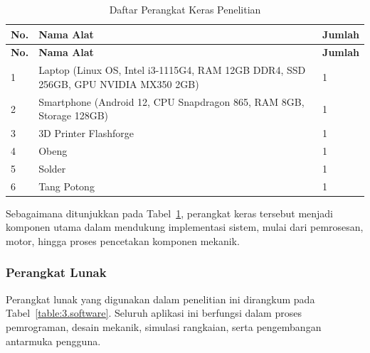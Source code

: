 \begin{longtable}{| b{}|p{}|p{}|} %
	\caption{Daftar Perangkat Keras Penelitian}
	\label{table:3.hardware} \\
	\hline
	\textbf{No.} & \textbf{Nama Alat} & \textbf{Jumlah} \\
	\hline
	\endfirsthead
	
	\hline
	\textbf{No.} & \textbf{Nama Alat} & \textbf{Jumlah} \\
	\hline
	\endhead
	
	1 & Laptop (Linux OS, Intel i3-1115G4, RAM 12GB DDR4, SSD 256GB, GPU NVIDIA MX350 2GB) & 1 \\
	\hline
	2 & Smartphone (Android 12, CPU Snapdragon 865, RAM 8GB, Storage 128GB) & 1 \\
	\hline
	3 & 3D Printer Flashforge & 1 \\
	\hline
	4 & Obeng & 1 \\
	\hline
	5 & Solder & 1 \\
	\hline
	6 & Tang Potong & 1 \\
	\hline
	
\end{longtable}
Sebagaimana ditunjukkan pada Tabel~\ref{table:3.hardware}, perangkat keras tersebut menjadi komponen utama dalam mendukung implementasi sistem, mulai dari pemrosesan, motor, hingga proses pencetakan komponen mekanik.

\subsubsection{Perangkat Lunak} \label{III.Alat.Lunak}
Perangkat lunak yang digunakan dalam penelitian ini dirangkum pada Tabel~\ref{table:3.software}. Seluruh aplikasi ini berfungsi dalam proses pemrograman, desain mekanik, simulasi rangkaian, serta pengembangan antarmuka pengguna.

